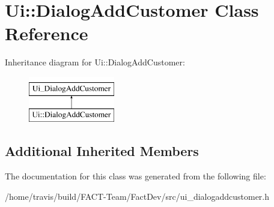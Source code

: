 \hypertarget{classUi_1_1DialogAddCustomer}{\section{Ui\-:\-:Dialog\-Add\-Customer Class Reference}
\label{classUi_1_1DialogAddCustomer}
}
Inheritance diagram for Ui\-:\-:Dialog\-Add\-Customer\-:\begin{figure}[H]
\begin{center}
\leavevmode
\includegraphics[height=2.000000cm]{de/d03/classUi_1_1DialogAddCustomer}
\end{center}
\end{figure}
\subsection*{Additional Inherited Members}


The documentation for this class was generated from the following file\-:\begin{DoxyCompactItemize}
\item 
/home/travis/build/\-F\-A\-C\-T-\/\-Team/\-Fact\-Dev/src/ui\-\_\-dialogaddcustomer.\-h\end{DoxyCompactItemize}
